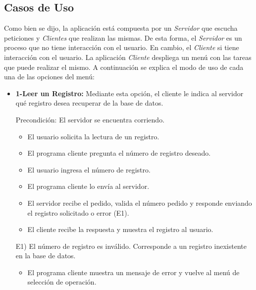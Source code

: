 \documentclass[a4paper,10pt]{article}
\begin{document}
			\subsection{Casos de Uso}

			Como bien se dijo, la aplicaci\'on est\'a compuesta por un \emph{Servidor} que escucha peticiones y \emph{Clientes} que realizan las mismas. 
			De esta forma, el \emph{Servidor} es un proceso que no tiene interacci\'on con el usuario. En cambio, el \emph{Cliente} si tiene interacci\'on
			con el usuario. La aplicaci\'on \emph{Cliente} despliega un men\'u con las tareas que puede realizar el mismo. A continuaci\'on se 
			explica el modo de uso de cada una de las opciones del men\'u: 

			\begin{itemize}
                                
                \item \textbf{1-Leer un Registro:} Mediante esta opci\'on, el cliente le indica al servidor qu\'e registro desea recuperar de la base de datos.

                Precondici\'on: El servidor se encuentra corriendo. 
                \begin{itemize}
                    \item El usuario solicita la lectura de un registro. 
                    \item El programa cliente pregunta el n\'umero de registro deseado. 
		    \item El usuario ingresa el n\'umero de registro. 
                    \item El programa cliente lo env\'ia al servidor.
                    \item El servidor recibe el pedido, valida el n\'umero pedido y responde enviando el registro solicitado o error (E1). 
		    \item El cliente recibe la respuesta y muestra el registro al usuario.
                \end{itemize}
                
                E1) El n\'umero de registro es inv\'alido. Corresponde a un registro inexistente en la base de datos. 
                    \begin{itemize}
                        \item El programa cliente muestra un mensaje de error y vuelve al men\'u de selecci\'on de operaci\'on.
				    \end{itemize}
                

\end{itemize}
\end{document}

